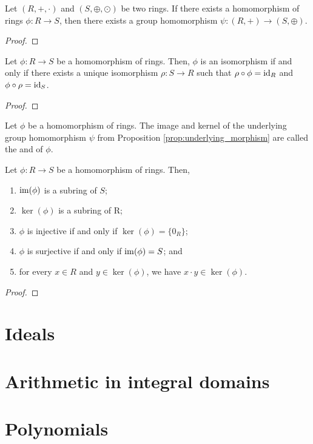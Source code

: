 \begin{prop}\label{prop:underlying_morphism}
Let $ (R,+,\cdot) $ and $ (S,\oplus,\odot) $ be two rings. If there exists a homomorphism of rings $ \phi:R\to S $, then there exists a group homomorphism $ \psi:(R,+)\to(S,\oplus) $.
\end{prop}
\begin{proof}
\end{proof}

\begin{prop}
Let $ \phi:R\to S $ be a homomorphism of rings. Then, $ \phi $ is an isomorphism if and only if there exists a unique isomorphism $ \rho:S\to R $ such that $ \rho\circ\phi=\operatorname{id}_R $ and $ \phi\circ\rho=\operatorname{id}_S $.
\end{prop}
\begin{proof}
\end{proof}

\begin{defn}
Let $ \phi $ be a homomorphism of rings. The image and kernel of the underlying group homomorphism $ \psi $ from Proposition \ref{prop:underlying_morphism} are called the  and  of $ \phi $.
\end{defn}

\begin{prop}
Let $ \phi:R\to S $ be a homomorphism of rings. Then,
\begin{enumerate}
    \item $ \operatorname{im}(\phi) $ is a subring of $ S $;
    \item $ \ker(\phi) $ is a subring of R;
    \item $ \phi $ is injective if and only if $ \ker(\phi)=\{0_R\} $;
    \item $ \phi $ is surjective if and only if $ \operatorname{im}(\phi)=S $; and
    \item for every $ x\in R $ and $ y\in\ker(\phi) $, we have $ x\cdot y\in\ker(\phi) $.
\end{enumerate}
\end{prop}
\begin{proof}
\end{proof}

\section{Ideals}

\section{Arithmetic in integral domains}

\section{Polynomials}

